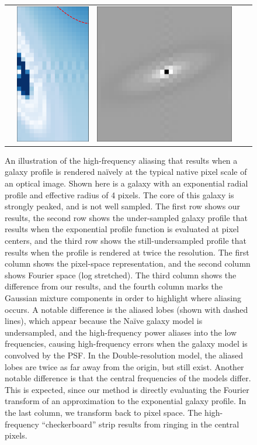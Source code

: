 \documentclass[11pt,preprint]{aastex}
\begin{document}
\begin{figure}[p!]
\begin{center}
\begin{tabular}{@{}ccccc@{}}
      &
      \includegraphics[height=0.24\textwidth]{lopass-diff-dclipmine-fourier-ann}
      &
      \includegraphics[height=0.24\textwidth]{lopass-diff-dclipmine-pix}
    \end{tabular}
    \caption{
      \label{fig:aliasing}
      An illustration of the high-frequency aliasing that results when
      a galaxy profile is rendered na\"ively at the typical native
      pixel scale of an optical image.  Shown here is a galaxy with an
      exponential radial profile and effective radius of 4 pixels.
      The core of this galaxy is strongly peaked, and is not well
      sampled.  The first row shows our results, the second row shows
      the under-sampled galaxy profile that results when the
      exponential profile function is evaluated at pixel centers, and
      the third row shows the still-undersampled profile that results
      when the profile is rendered at twice the resolution.
      The first column shows the pixel-space representation, and the
      second column shows Fourier space (log stretched).  The third
      column shows the difference from our results, and the fourth
      column marks the Gaussian mixture components in order to
      highlight where aliasing occurs.  A notable difference is the
      aliased lobes (shown with dashed lines), which appear because
      the Na\"ive galaxy model is undersampled, and the high-frequency
      power aliases into the low frequencies, causing high-frequency
      errors when the galaxy model is convolved by the PSF.  In the
      Double-resolution model, the aliased lobes are twice as far away
      from the origin, but still exist.  Another notable difference is
      that the central frequencies of the models differ.  This is
      expected, since our method is directly evaluating the Fourier
      transform of an approximation to the exponential galaxy profile.
      In the last column, we transform back to pixel space.  The
      high-frequency ``checkerboard'' strip results from ringing in
      the central pixels.
    }
  \end{center}
\end{figure}
\end{document}

